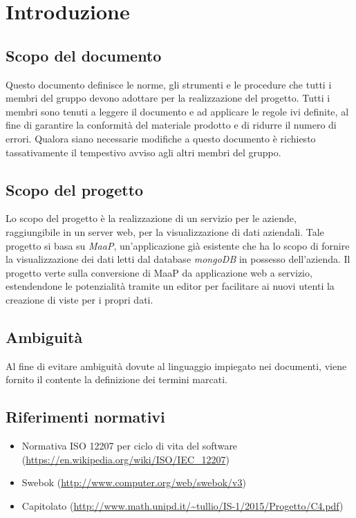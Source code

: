 \section{Introduzione}

\subsection{Scopo del documento}
Questo documento definisce le norme, gli strumenti e le procedure che tutti i membri del gruppo devono adottare per la realizzazione del progetto. Tutti i membri sono tenuti a leggere il documento e ad applicare le regole ivi definite, al fine di garantire la conformità del materiale prodotto e di ridurre il numero di errori. Qualora siano necessarie modifiche a questo documento è richiesto tassativamente il tempestivo avviso agli altri membri del gruppo.


\subsection{Scopo del progetto}
Lo scopo del progetto è la realizzazione di un servizio per le aziende, raggiungibile in un server web, per la visualizzazione di dati aziendali. Tale progetto si basa su \textit{MaaP}, un'applicazione già esistente che ha lo scopo di fornire la visualizzazione dei dati letti dal database \textit{mongoDB} in possesso dell'azienda. Il progetto verte sulla conversione di MaaP da applicazione web a servizio, estendendone le potenzialità tramite un editor per facilitare ai nuovi utenti la creazione di viste per i propri dati.

\subsection{Ambiguit\`a}
Al fine di evitare ambiguità dovute al linguaggio impiegato nei documenti, viene fornito il \Glossario contente la definizione dei termini marcati.


\subsection{Riferimenti normativi}
\begin{itemize}
\item Normativa ISO 12207 per ciclo di vita del software (\url{https://en.wikipedia.org/wiki/ISO/IEC_12207})
\item Swebok (\url{http://www.computer.org/web/swebok/v3})
\item Capitolato (\url{http://www.math.unipd.it/~tullio/IS-1/2015/Progetto/C4.pdf})
\end{itemize}

